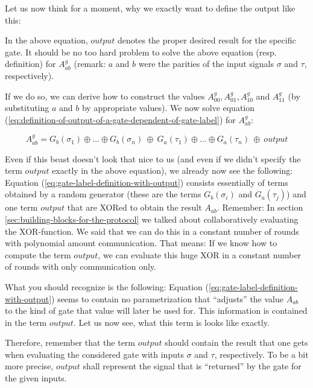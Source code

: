 \message{ !name(seminar.tex)}\documentclass{llncs}
\begin{document}
Let us now think for a moment, why we exactly want to define the output like this: 

In the above equation, $output$ denotes the proper desired result for the specific gate. It should be no too hard problem to solve the above equation (resp. definition) for $A_{ab}^g$ (remark: $a$ and $b$ were the parities of the input signals $\sigma$ and $\tau$, respectively). 

If we do so, we can derive how to construct the values $A_{00}^g,A_{01}^g,A_{10}^g$ and $A_{11}^g$ (by substituting $a$ and $b$ by appropriate values). We now solve equation (\ref{eq:definition-of-output-of-a-gate-dependent-of-gate-label}) for $A_{ab}^g$:

\begin{equation}
  \label{eq:gate-label-definition-with-output}
  A_{ab}^g = G_b(\sigma_1)\oplus\dots\oplus G_b(\sigma_n) \ \oplus \ G_a(\tau_1)\oplus\dots\oplus G_a(\tau_n) \ \oplus \ output
\end{equation}

Even if this beast doesn't look that nice to us (and even if we didn't specify the term $output$ exactly in the above equation), we already now see the following: Equation (\ref{eq:gate-label-definition-with-output}) consists essentially of terms obtained by a random generator (these are the terms $G_b(\sigma_i)$ and $G_a(\tau_j)$) and one term $output$ that are XORed to obtain the result $A_{ab}$. Remember: In section \ref{sec:building-blocks-for-the-protocol} we talked about collaboratively evaluating the XOR-function. We said that we can do this in a constant number of rounds with polynomial amount communication. That means: If we know how to compute the term $output$, we can evaluate this huge XOR in a constant number of rounds with only communication only.

What you should recognize is the following: Equation (\ref{eq:gate-label-definition-with-output}) seems to contain no parametrization that ``adjusts'' the value $A_{ab}$ to the kind of gate that value will later be used for. This information is contained in the term $output$. Let us now see, what this term is looks like exactly.

Therefore, remember that the term $output$ should contain the result that one gets when evaluating the considered gate with inputs $\sigma$ and $\tau$, respectively. To be a bit more precise, $output$ shall represent the signal that is ``returned'' by the gate for the given inputs.
\end{document}
